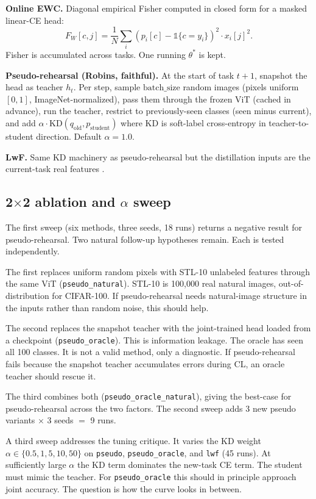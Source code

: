 \documentclass[conference]{IEEEtran}
\begin{document}
\textbf{Online EWC.} Diagonal empirical Fisher computed in closed form for
a masked linear-CE head:
\begin{equation}
F_W[c, j] = \frac{1}{N} \sum_i (p_i[c] - \mathbb{1}\{c = y_i\})^2 \cdot x_i[j]^2.
\end{equation}
Fisher is accumulated across tasks. One running $\theta^*$ is kept.

\textbf{Pseudo-rehearsal (Robins, faithful).} At the start of task $t+1$,
snapshot the head as teacher $h_t$. Per step, sample $\text{batch\_size}$
random images (pixels uniform $[0, 1]$, ImageNet-normalized), pass them
through the frozen ViT (cached in advance), run the teacher, restrict to
previously-seen classes (seen minus current), and add $\alpha \cdot
\text{KD}(q_{\text{old}}, p_{\text{student}})$ where KD is soft-label
cross-entropy in teacher-to-student direction. Default $\alpha = 1.0$.

\textbf{LwF.} Same KD machinery as pseudo-rehearsal but the distillation
inputs are the current-task real features
\citep{li2017lwf}.

\subsection{2$\times$2 ablation and $\alpha$ sweep}

The first sweep (six methods, three seeds, 18 runs) returns a negative
result for pseudo-rehearsal. Two natural follow-up hypotheses remain.
Each is tested independently.

The first replaces uniform random pixels with STL-10 unlabeled features
through the same ViT (\texttt{pseudo\_natural}). STL-10 is 100{,}000 real
natural images, out-of-distribution for CIFAR-100. If pseudo-rehearsal
needs natural-image structure in the inputs rather than random noise, this
should help.

The second replaces the snapshot teacher with the joint-trained head loaded
from a checkpoint (\texttt{pseudo\_oracle}). This is information leakage.
The oracle has seen all 100 classes. It is not a valid method, only a
diagnostic. If pseudo-rehearsal fails because the snapshot teacher
accumulates errors during CL, an oracle teacher should rescue it.

The third combines both (\texttt{pseudo\_oracle\_natural}), giving the
best-case for pseudo-rehearsal across the two factors. The second sweep
adds 3 new pseudo variants $\times$ 3 seeds $=$ 9 runs.

A third sweep addresses the tuning critique. It varies the KD weight
$\alpha \in \{0.5, 1, 5, 10, 50\}$ on \texttt{pseudo},
\texttt{pseudo\_oracle}, and \texttt{lwf} (45 runs). At sufficiently large
$\alpha$ the KD term dominates the new-task CE term. The student must mimic
the teacher. For \texttt{pseudo\_oracle} this should in principle approach
joint accuracy. The question is how the curve looks in between.
\end{document}
